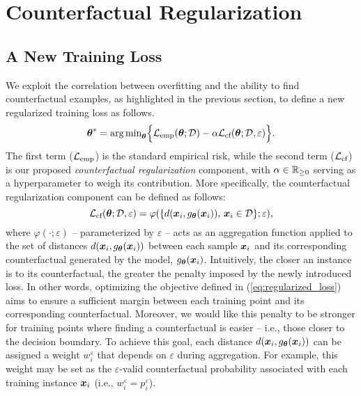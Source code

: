 \section{Counterfactual Regularization}
\label{sec:method}
\subsection{A New Training Loss}
\label{subsec:new-loss}
We exploit the correlation between overfitting and the ability to find counterfactual examples, as highlighted in the previous section, to define a new regularized training loss as follows.
\begin{equation}\label{eq:regularized_loss}
\boldsymbol{\theta}^* = \text{arg\,min}_{\boldsymbol{\theta}}\Big\{\mathcal{L}_{\text{emp}}(\boldsymbol{\theta};\mathcal{D}) - \alpha \mathcal{L}_{\text{cf}}(\boldsymbol{\theta};\mathcal{D},\varepsilon)\Big\}.
\end{equation}
The first term ($\mathcal{L}_{\text{emp}}$) is the standard empirical risk, while the second term ($\mathcal{L}_{\text{cf}}$) is our proposed \textit{counterfactual regularization} component, with $\alpha \in \mathbb{R}_{\geq 0}$ serving as a hyperparameter to weigh its contribution. 
More specifically, the counterfactual regularization component can be defined as follows:
\begin{equation}\label{eq:cf_loss}
\mathcal{L}_{\text{cf}}(\boldsymbol{\theta};\mathcal{D},\varepsilon) = \varphi(\{d(\boldsymbol{x}_i, g_{\boldsymbol{\theta}}(\boldsymbol{x}_i)),\, \boldsymbol{x}_i \in \mathcal{D} \};\varepsilon),
\end{equation}
where $\varphi (\cdot;\varepsilon)$ -- parameterized by $\varepsilon$ -- acts as an aggregation function applied to the set of distances $d(\boldsymbol{x}_i, g_{\boldsymbol{\theta}}(\boldsymbol{x}_i))$ between each sample $\boldsymbol{x}_i$ and its corresponding counterfactual generated by the model, $g_{\boldsymbol{\theta}}(\boldsymbol{x}_i)$.
Intuitively, the closer an instance is to its counterfactual, the greater the penalty imposed by the newly introduced loss. In other words, optimizing the objective defined in (\ref{eq:regularized_loss}) aims to ensure a sufficient margin between each training point and its corresponding counterfactual. 
Moreover, we would like this penalty to be stronger for training points where finding a counterfactual is easier -- i.e., those closer to the decision boundary.
To achieve this goal, each distance $d(\boldsymbol{x}_i, g_{\boldsymbol{\theta}}(\boldsymbol{x}_i))$ can be assigned a weight $w_i^{\varepsilon}$ that depends on $\varepsilon$ during aggregation. For example, this weight may be set as the $\varepsilon$-valid counterfactual probability associated with each training instance $\boldsymbol{x}_i$ (i.e., $w_i^{\varepsilon} = p_i^{\varepsilon}$). 

